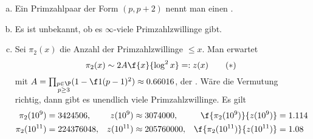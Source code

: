 \begin{nt}[Primzahlzwillinge] \label{7.12}
	\begin{enumerate}[a)]
		\item
			Ein Primzahlpaar der Form $(p, p+2)$ nennt man einen .
		\item
			Es ist unbekannt, ob es $\infty$-viele Primzahlzwillinge gibt.
		\item
			Sei $\pi_2(x)$ die Anzahl der Primzahlzwillinge $\le x$.
			Man erwartet
			\begin{equation}
				\label{eq:prime_twins}
				\pi_2(x) \sim 2A \f{x}{\log^2 x} =: z(x) \tag{$\ast$}
			\end{equation}
			mit $A = \prod_{\substack{p \in \P \\ p \ge 3}} (1 - \f 1{(p-1)^2}) \approx 0.66016$, der .
			Wäre die Vermutung richtig, dann gibt es unendlich viele Primzahlzwillinge.
			Es gilt
			\begin{align*}
				\pi_2(10^9) &= 3 424 506, & z(10^9) &\approx 3 074 000, &  \f{\pi_2(10^9)}{z(10^9)} &= 1.114 \\
				\pi_2(10^{11}) &= 224 376 048, & z(10^{11}) &\approx 205 760 000, & \f{\pi_2(10^{11})}{z(10^{11})} &= 1.08\\
			\end{align*}
	\end{enumerate}
\end{nt}

